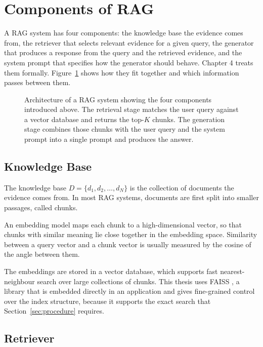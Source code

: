 \documentclass[12pt,a4paper,oneside]{scrreprt}
\begin{document}
\section{Components of RAG}

A RAG system has four components: the knowledge base the evidence comes from,
the retriever that selects relevant evidence for a given query, the generator
that produces a response from the query and the retrieved evidence, and the
system prompt that specifies how the generator should behave. Chapter 4 treats them formally.
Figure~\ref{fig:rag} shows how they fit together and which information passes between
them.

\begin{figure}[htbp]
\centering
\resizebox{\textwidth}{!}{}
\caption{Architecture of a RAG system showing the four components introduced above. The retrieval stage matches the user query against a vector database and returns the top-$K$ chunks. The generation stage combines those chunks with the user query and the system prompt into a single prompt and produces the answer.}
\label{fig:rag}
\end{figure}

\subsection{Knowledge Base}

The knowledge base $D = \{d_1, d_2, \ldots, d_N\}$ is the collection of documents
the evidence comes from. In most RAG systems, documents are first split
into smaller passages, called chunks. 

An embedding model maps each chunk to a high-dimensional vector, so that
chunks with similar meaning lie close together in the embedding space.
Similarity between a query vector and a chunk vector is usually measured by the
cosine of the angle between them.

The embeddings are stored in a vector database, which supports fast
nearest-neighbour search over large collections of chunks. This thesis uses FAISS \citep{johnson2021faiss}, a library that is embedded directly in an application and gives fine-grained control over the index structure, because it supports the exact search that Section~\ref{sec:procedure} requires.
\subsection{Retriever}
\end{document}
